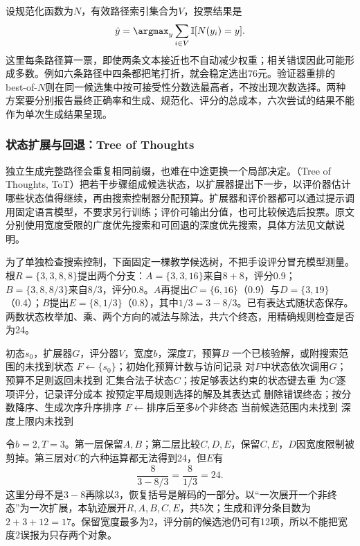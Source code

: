 设规范化函数为$N$，有效路径索引集合为$V$，投票结果是
\[
 \hat y=\argmax_y\sum_{i\in V}\mathbb{I}[N(y_i)=y].
\]
这里每条路径算一票，即使两条文本接近也不自动减少权重；相关错误因此可能形成多数。例如六条路径中四条都把笔打折，就会稳定选出76元。验证器重排的best-of-$N$则在同一候选集中按可接受性分数选最高者，不按出现次数选择。两种方案要分别报告最终正确率和生成、规范化、评分的总成本，六次尝试的结果不能作为单次生成结果呈现。

\subsubsection{状态扩展与回退：Tree of Thoughts}
\label{sec:nlp-execution-tot}

独立生成完整路径会重复相同前缀，也难在中途更换一个局部决定。（Tree of Thoughts, ToT）把若干步骤组成候选状态，以扩展器提出下一步，以评价器估计哪些状态值得继续，再由搜索控制器分配预算。扩展器和评价器都可以通过提示调用固定语言模型，不要求另行训练；评价可输出分值，也可比较候选后投票。原文分别使用宽度受限的广度优先搜索和可回退的深度优先搜索，具体方法见文献说明。

为了单独检查搜索控制，下面固定一棵教学候选树，不把手设评分冒充模型测量。根$R=\{3,3,8,8\}$提出两个分支：$A=\{3,3,16\}$来自$8+8$，评分0.9；$B=\{3,8,8/3\}$来自$8/3$，评分0.8。$A$再提出$C=\{6,16\}$（0.9）与$D=\{3,19\}$（0.4）；$B$提出$E=\{8,1/3\}$（0.8），其中$1/3=3-8/3$。已有表达式随状态保存。两数状态枚举加、乘、两个方向的减法与除法，共六个终态，用精确规则检查是否为24。

\begin{algorithm}[宽度受限的ToT广度优先搜索]
\label{alg:nlp-execution-tot-bfs}
\begin{algorithmic}[1]
\Require 初态$s_0$，扩展器$G$，评分器$V$，宽度$b$，深度$T$，预算$B$
\Ensure 一个已核验解，或附搜索范围的未找到状态
\State $F\gets\{s_0\}$；初始化预算计数与访问记录
  \State 对$F$中状态依次调用$G$；预算不足则返回未找到
  \State 汇集合法子状态$C$；按足够表达约束的状态键去重
  \State 为$C$逐项评分，记录评分成本
    \State \Return 按预定平局规则选择的解及其表达式
  \EndIf
  \State 删除错误终态；按分数降序、生成次序升序排序
  \State $F\gets$排序后至多$b$个非终态
    \State \Return 当前候选范围内未找到
  \EndIf
\EndFor
\State \Return 深度上限内未找到
\end{algorithmic}
\end{algorithm}

令$b=2,T=3$。第一层保留$A,B$；第二层比较$C,D,E$，保留$C,E$，$D$因宽度限制被剪掉。第三层对$C$的六种运算都无法得到24，但$E$有
\[
 \frac{8}{3-8/3}=\frac{8}{1/3}=24.
\]
这里分母不是$3-8$再除以3，恢复括号是解码的一部分。以“一次展开一个非终态”为一次扩展，本轨迹展开$R,A,B,C,E$，共5次；生成和评分条目数为$2+3+12=17$。保留宽度最多为2，评分前的候选池仍可有12项，所以不能把宽度2误报为只存两个对象。

